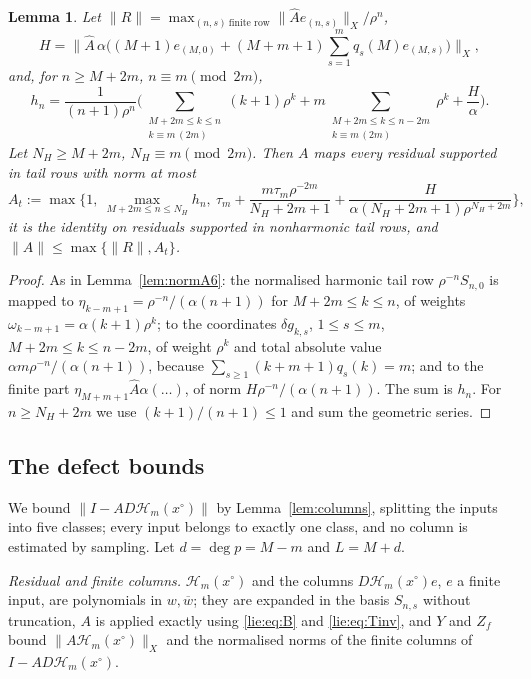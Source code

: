 \documentclass[11pt]{amsart}
\newtheorem{lemma}[theorem]{Lemma}
\theoremstyle{definition}
\theoremstyle{remark}
\numberwithin{equation}{section}
\newcommand{\bw}{\overline{w}}
\newcommand{\nrm}[1]{\lVert #1\rVert}
\newcommand{\Hc}{\mathcal{H}}
\begin{document}
\begin{lemma}\label{lie:lem:normA}
Let $\nrm R=\max_{(n,s)\ \text{finite row}}\nrm{\widehat Ae_{(n,s)}}_X/\rho^n$,
\[
H=\Big\|\widehat A\,\alpha\Big((M+1)e_{(M,0)}+(M+m+1)\sum_{s=1}^mq_s(M)e_{(M,s)}\Big)\Big\|_X,
\]
and, for $n\geq M+2m$, $n\equiv m\pmod{2m}$,
\begin{equation}\label{lie:eq:hn}
h_n=\frac1{(n+1)\rho^n}\Big(\sum_{\substack{M+2m\leq k\leq n\\k\equiv m\,(2m)}}(k+1)\rho^k+m\sum_{\substack{M+2m\leq k\leq n-2m\\k\equiv m\,(2m)}}\rho^k+\frac H\alpha\Big).
\end{equation}
Let $N_H\geq M+2m$, $N_H\equiv m\pmod{2m}$. Then $A$ maps every residual supported in tail rows with norm at most
\[
A_t:=\max\Big\{1,\ \max_{M+2m\leq n\leq N_H}h_n,\ \tau_m+\frac{m\tau_m\rho^{-2m}}{N_H+2m+1}+\frac H{\alpha(N_H+2m+1)\rho^{N_H+2m}}\Big\},
\]
it is the identity on residuals supported in nonharmonic tail rows, and $\nrm A\leq\max\{\nrm R,A_t\}$.
\end{lemma}

\begin{proof}
As in Lemma~\ref{lem:normA6}: the normalised harmonic tail row $\rho^{-n}S_{n,0}$ is mapped to $\eta_{k-m+1}=\rho^{-n}/(\alpha(n+1))$ for $M+2m\leq k\leq n$, of weights $\omega_{k-m+1}=\alpha(k+1)\rho^k$; to the coordinates $\delta g_{k,s}$, $1\leq s\leq m$, $M+2m\leq k\leq n-2m$, of weight $\rho^k$ and total absolute value $\alpha m\rho^{-n}/(\alpha(n+1))$, because $\sum_{s\geq1}(k+m+1)q_s(k)=m$; and to the finite part $\eta_{M+m+1}\widehat A\alpha(\ldots)$, of norm $H\rho^{-n}/(\alpha(n+1))$. The sum is $h_n$. For $n\geq N_H+2m$ we use $(k+1)/(n+1)\leq1$ and sum the geometric series.
\end{proof}

\subsection{The defect bounds}\label{lie:subsec:Z}

We bound $\nrm{I-AD\Hc_m(x^\circ)}$ by Lemma~\ref{lem:columns}, splitting the inputs into five classes; every input belongs to exactly one class, and no column is estimated by sampling. Let $d=\deg p=M-m$ and $L=M+d$.

\emph{Residual and finite columns.} $\Hc_m(x^\circ)$ and the columns $D\Hc_m(x^\circ)e$, $e$ a finite input, are polynomials in $w,\bw$; they are expanded in the basis $S_{n,s}$ without truncation, $A$ is applied exactly using \eqref{lie:eq:B} and \eqref{lie:eq:Tinv}, and $Y$ and $Z_f$ bound $\nrm{A\Hc_m(x^\circ)}_X$ and the normalised norms of the finite columns of $I-AD\Hc_m(x^\circ)$.
\end{document}
